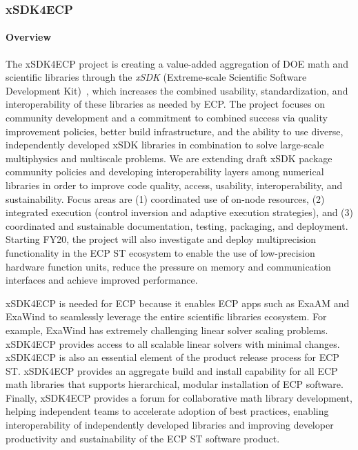 \subsubsection{ xSDK4ECP} 
\paragraph{Overview} The xSDK4ECP project is creating a value-added aggregation of DOE math and scientific libraries through the {\em xSDK} (Extreme-scale Scientific Software Development Kit)~\cite{xsdk:homepage}, which increases the combined usability, standardization, and interoperability of these libraries as needed by ECP. The project focuses on community development and a commitment to combined success via quality improvement policies, better build infrastructure, and the ability to use diverse, independently developed xSDK libraries in combination to solve large-scale multiphysics and multiscale problems.  We are extending draft xSDK package community policies and developing interoperability layers among numerical libraries in order to improve code quality, access, usability, interoperability, and sustainability. Focus areas are (1) coordinated use of on-node resources, (2) integrated execution (control inversion and adaptive execution strategies), and (3) coordinated and sustainable documentation, testing, packaging, and deployment. Starting FY20, the project will also investigate and deploy multiprecision functionality in the ECP ST ecosystem to enable the use of low-precision hardware function units, reduce the pressure on memory and communication interfaces and achieve improved performance.

xSDK4ECP is needed for ECP because it enables ECP apps such as ExaAM and ExaWind to seamlessly leverage the entire scientific libraries ecosystem.  For example, ExaWind has extremely challenging linear solver scaling problems.  xSDK4ECP provides access to all scalable linear solvers with minimal changes.  xSDK4ECP is also an essential element of the product release process for ECP ST.  xSDK4ECP provides an aggregate build and install capability for all ECP math libraries that supports hierarchical, modular installation of ECP software.  Finally, xSDK4ECP provides a forum for collaborative math library development, helping independent teams to accelerate adoption of best practices, enabling interoperability of independently developed libraries and improving developer productivity and sustainability of the ECP ST software product.

